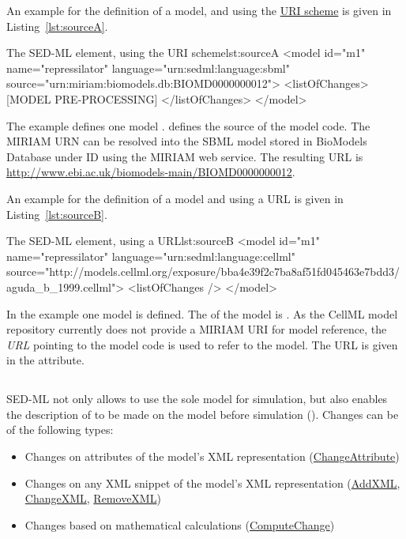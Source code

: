 An example for the definition of a model, and using the  \hyperref[sec:uriScheme]{URI scheme} is given in Listing~\ref{lst:sourceA}.

\begin{myXmlLst}{The SED-ML  element, using the URI scheme}{lst:sourceA}
<model id="m1" name="repressilator" language="urn:sedml:language:sbml" 
	source="urn:miriam:biomodels.db:BIOMD0000000012">
	<listOfChanges>
		[MODEL PRE-PROCESSING]
	</listOfChanges>
</model>
\end{myXmlLst}

The example defines one model .  defines the source of the model code. The MIRIAM URN can be resolved into the SBML model stored in BioModels Database under ID  using the MIRIAM web service. The resulting URL is \url{http://www.ebi.ac.uk/biomodels-main/BIOMD0000000012}.

An example for the definition of a model and using a URL is given in Listing~\ref{lst:sourceB}.

\begin{myXmlLst}{The SED-ML  element, using a URL}{lst:sourceB}
<model id="m1" name="repressilator" language="urn:sedml:language:cellml" 
	source="http://models.cellml.org/exposure/bba4e39f2c7ba8af51fd045463e7bdd3/aguda_b_1999.cellml">
	<listOfChanges />
</model>
\end{myXmlLst}

In the example one model is defined. The  of the model is . As the CellML model repository currently does not provide a MIRIAM URI for model reference, the \emph{URL} pointing to the model code is used to refer to the model. The URL is given in the  attribute.


\subsection{}
\label{class:change}
SED-ML not only allows to use the sole model for simulation, but also enables the description of  to be made on the model before simulation  (). Changes can be of the following types:
\begin{itemize}
	\item{Changes on attributes of the model's XML representation (\hyperref[class:changeAttribute]{ChangeAttribute})}
	\item{Changes on any XML snippet of the model's XML representation (\hyperref[class:addXml]{AddXML}, \hyperref[class:changeXml]{ChangeXML}, \hyperref[class:removeXml]{RemoveXML})}
	\item{Changes based on mathematical calculations (\hyperref[class:computeChange]{ComputeChange})} 
\end{itemize}

